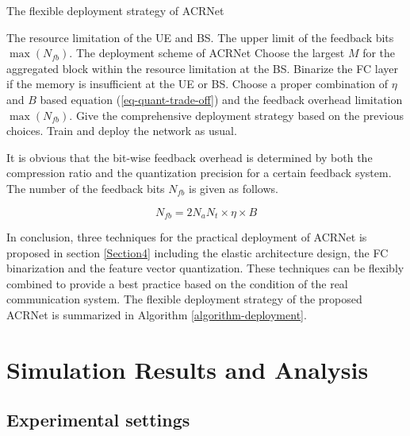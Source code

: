 \documentclass[12pt, draftclsnofoot, onecolumn]{IEEEtran}
\begin{document}
\begin{algorithm}[!t]
\renewcommand{\algorithmicrequire}{\textbf{Input:}}
\renewcommand\algorithmicensure {\textbf{Output:}}
\caption{The flexible deployment strategy of ACRNet}
\label{algorithm-deployment}
\begin{algorithmic}[1]

\REQUIRE The resource limitation of the UE and BS. The upper limit of the feedback bits $\max(N_{fb})$.
\ENSURE The deployment scheme of ACRNet
\STATE Choose the largest $M$ for the aggregated block within the resource limitation at the BS.
\STATE Binarize the FC layer if the memory is insufficient at the UE or BS.
\STATE Choose a proper combination of $\eta$ and $B$ based equation (\ref{eq-quant-trade-off}) and the feedback overhead limitation $\max(N_{fb})$.
\STATE Give the comprehensive deployment strategy based on the previous choices. Train and deploy the network as usual.

\end{algorithmic}
\end{algorithm}

It is obvious that the bit-wise feedback overhead is determined by both the compression ratio and the quantization precision for a certain feedback system. The number of the feedback bits $N_{fb}$ is given as follows.

\begin{equation} \label{eq-quant-trade-off}
  N_{fb} = 2N_aN_t\times\eta\times B
\end{equation}

In conclusion, three techniques for the practical deployment of ACRNet is proposed in section \ref{Section4} including the elastic architecture design, the FC binarization and the feature vector quantization. These techniques can be flexibly combined to provide a best practice based on the condition of the real communication system. The flexible deployment strategy of the proposed ACRNet is summarized in Algorithm \ref{algorithm-deployment}.

\section{Simulation Results and Analysis} \label{Section5}

\subsection{Experimental settings} \label{Section5-1}
\end{document}

